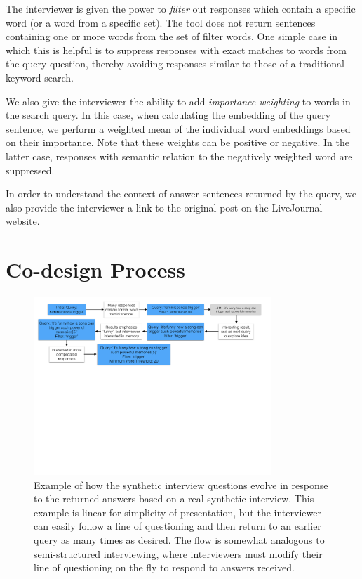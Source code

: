 \documentclass{sigchi}
\begin{document}
The interviewer is given the power to {\em filter} out responses which contain a specific word (or a word from a specific set). The tool does not return sentences containing one or more words from the set of filter words. One simple case in which this is helpful is to suppress responses with exact matches to words from the query question, thereby avoiding responses similar to those of a traditional keyword search.

We also give the interviewer the ability to add {\em importance weighting} to words in the search query. In this case, when calculating the embedding of the query sentence, we perform a weighted mean of the individual word embeddings based on their importance. Note that these weights can be positive or negative. In the latter case, responses with semantic relation to the negatively weighted word are suppressed.

In order to understand the context of answer sentences returned by the query, we also provide the interviewer a link to the original post on the LiveJournal website. 

\section{Co-design Process}
\begin{figure}[tb]
\centering \includegraphics[width=0.8\textwidth]{figures/InterviewFlow.pdf} 
\caption{Example of how the synthetic interview questions evolve in response to the returned answers based on a real synthetic interview. This example is linear for simplicity of presentation, but the interviewer can easily follow a line of questioning and then return to an earlier query as many times as desired. The flow is somewhat analogous to semi-structured interviewing, where interviewers must modify their line of questioning on the fly to respond to answers received.\label{fig:interviewFlow}}
\end{figure}
\end{document}
